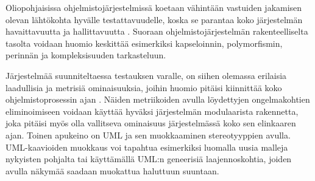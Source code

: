 \documentclass[finnish]{tktltiki2}
\numberwithin{table}{section}
\theoremstyle{definition}
\theoremstyle{remark}
\begin{document}
Oliopohjaisissa ohjelmistojärjestelmissä koetaan vähintään vastuiden jakamisen olevan lähtökohta hyvälle testattavuudelle, koska se parantaa koko järjestelmän havaittavuutta ja hallittavuutta \citep{Binder:1994:DTO:182987.184077}. Suoraan ohjelmistojärjestelmän rakenteelliselta tasolta voidaan huomio keskittää esimerkiksi kapseloinnin, polymorfismin, perinnän ja kompleksisuuden tarkasteluun. 

Järjestelmää suunniteltaessa testauksen varalle, on siihen olemassa erilaisia laadullisia ja metrisiä ominaisuuksia, joihin huomio pitäisi kiinnittää koko ohjelmistoprosessin ajan \citep{joshi_design_2014}. Näiden metriikoiden avulla löydettyjen ongelmakohtien eliminoimiseen voidaan käyttää hyväksi järjestelmän modulaarista rakennetta, joka pitäisi myös olla vallitseva ominaisuus järjestelmässä koko sen elinkaaren ajan. Toinen apukeino on UML ja sen  muokkaaminen stereotyyppien avulla. UML-kaavioiden muokkaus voi tapahtua esimerkiksi luomalla uusia malleja nykyisten pohjalta tai käyttämällä UML:n geneerisiä laajennoskohtia, joiden avulla näkymää saadaan muokattua haluttuun suuntaan.





\begin{table}[H]
	\centering
	\setlength{\extrarowheight}{10pt}%
	\caption{Hyvään testattavuuteen rakenteellisella tasolla vaikuttavat ominaisuudet jaoteltuna kahteen eri luokkaan: laadulliset ja metriset.}
	\label{tab:goodArchTestability}
\end{table}
\end{document}
